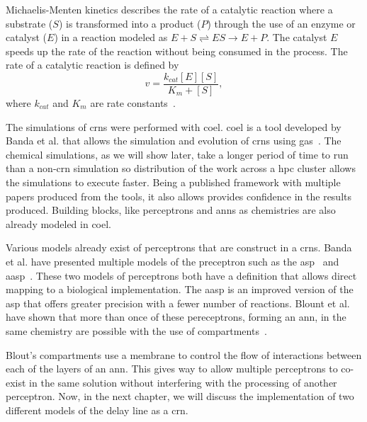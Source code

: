 Michaelis-Menten kinetics describes the rate of a catalytic reaction where a substrate ($S$) is transformed into a product ($P$) through the use of an enzyme or catalyst ($E$) in a reaction modeled as $E + S \rightleftharpoons ES \rightarrow E + P$. The catalyst $E$ speeds up the rate of the reaction without being consumed in the process. The rate of a catalytic reaction is defined by
\begin{equation}
v = \frac{k_{cat}[E][S]}{K_m+[S]},
\end{equation}
where $k_{cat}$ and $K_m$ are rate constants~\cite{Copeland2004-sq}.

The simulations of \glspl{crn} were performed with \acrfull{coel}. \Gls{coel} is a tool developed by Banda et al. that allows the simulation and evolution of \glspl{crn} using \glspl{ga}~\cite{Banda2014-qw}. The chemical simulations, as we will show later, take a longer period of time to run than a non-\gls{crn} simulation so distribution of the work across a \gls{hpc} cluster allows the simulations to execute faster. Being a published framework with multiple papers produced from the tools, it also allows provides confidence in the results produced. Building blocks, like perceptrons and \glspl{ann} as chemistries are also already modeled in \gls{coel}.

Various models already exist of perceptrons that are construct in a \glspl{crn}. Banda et al. have presented multiple models of the preceptron such as the \gls{asp}~\cite{Banda2014-bp} and \gls{aasp}~\cite{Banda2014-kg}. These two models of perceptrons both have a definition that allows direct mapping to a biological implementation. The \gls{aasp} is an improved version of the \gls{asp} that offers greater precision with a fewer number of reactions. Blount et al. have shown that more than once of these pereceptrons, forming an \gls{ann}, in the same chemistry are possible with the use of compartments~\cite{Blount_undated-ro}.

Blout's compartments use a membrane to control the flow of interactions between each of the layers of an \gls{ann}. This gives way to allow multiple perceptrons to co-exist in the same solution without interfering with the processing of another perceptron. Now, in the next chapter, we will discuss the implementation of two different models of the delay line as a \gls{crn}.

